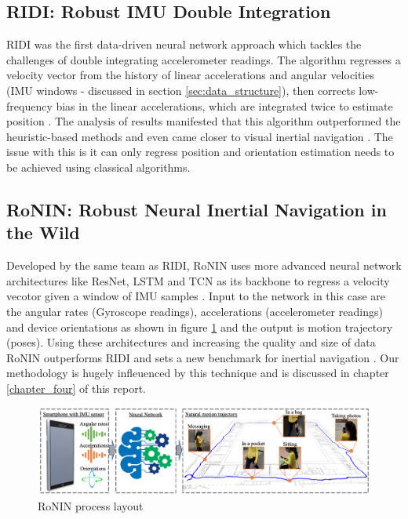 \subsection{RIDI: Robust IMU Double Integration}
RIDI was the first data-driven neural network approach which tackles the challenges of double integrating accelerometer readings. The algorithm regresses a velocity vector from the history of linear accelerations and angular velocities (IMU windows - discussed in section \ref{sec:data_structure}), then corrects low-frequency bias in the linear accelerations, which are integrated twice to estimate position \citep{yan2018ridi}. The analysis of results manifested that this algorithm outperformed the heuristic-based methods and even came closer to visual inertial navigation \citep{yan2018ridi}. The issue with this is it can only regress position and orientation estimation needs to be achieved using classical algorithms.

\subsection{RoNIN: Robust Neural Inertial Navigation in the Wild}
Developed by the same team as RIDI, RoNIN uses more advanced neural network architectures like ResNet, LSTM and TCN as its backbone to regress a velocity vecotor given a window of IMU samples \citep{herath2020ronin}. Input to the network in this case are the angular rates (Gyroscope readings), accelerations (accelerometer readings) and device orientations as shown in figure \ref{fig:ronin} and the output is motion trajectory (poses). Using these architectures and increasing the quality and size of data RoNIN outperforms RIDI and sets a new benchmark for inertial navigation \citep{herath2020ronin}. Our methodology is hugely infleuenced by this technique and is discussed in chapter \ref{chapter_four} of this report.

\begin{figure}[H]
    \centering
    \includegraphics[scale=0.21]{images/fig_chapter3/ronin.png}
    \caption{RoNIN process layout \citep{herath2020ronin}}
    \label{fig:ronin}
\end{figure}

